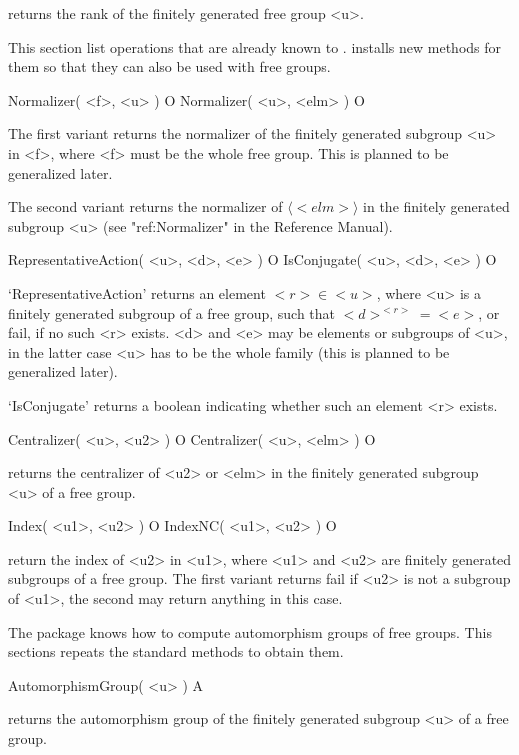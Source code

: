 returns the rank of the finitely generated free group <u>.


This section list operations that are already known to {\GAP}.
{\FGA} installs new methods for them so that they can also be used
with free groups.

\>Normalizer( <f>, <u> ) O
\>Normalizer( <u>, <elm> ) O

The first variant returns the normalizer of the finitely generated
subgroup <u> in <f>, where <f> must be the whole free group. This is
planned to be generalized later.

The second variant returns the normalizer of $\langle <elm> \rangle$
in the finitely generated subgroup <u> (see "ref:Normalizer" in the
Reference Manual).

\>RepresentativeAction( <u>, <d>, <e> ) O
\>IsConjugate( <u>, <d>, <e> ) O

`RepresentativeAction' returns an element $ <r> \in <u> $,
where <u> is a finitely generated subgroup of a free group, such
that $<d>^{<r>}=<e>$, or fail, if no such <r> exists.  <d> and <e> may
be elements or subgroups of <u>, in the latter case <u> has to be the
whole family (this is planned to be generalized later).

`IsConjugate' returns a boolean indicating whether such an element <r>
exists.

\>Centralizer( <u>, <u2> ) O
\>Centralizer( <u>, <elm> ) O

returns the centralizer of <u2> or <elm> in the finitely generated
subgroup <u> of a free group.

\>Index( <u1>, <u2> ) O
\>IndexNC( <u1>, <u2> ) O

return the index of <u2> in <u1>, where <u1> and <u2> are finitely
generated subgroups of a free group.  The first variant returns
fail if <u2> is not a subgroup of <u1>, the second may return
anything in this case.


The {\FGA} package knows how to compute automorphism groups of free
groups. This sections repeats the {\GAP} standard methods to obtain them.

\>AutomorphismGroup( <u> ) A

returns the automorphism group of the finitely generated subgroup <u>
of a free group.

